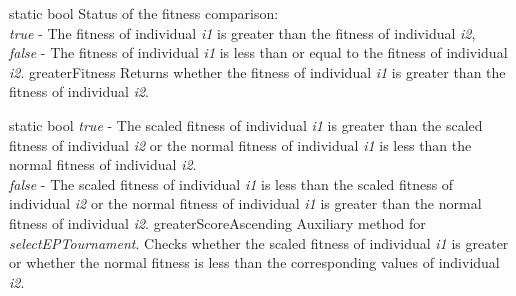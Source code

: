 \vspace*{4ex}

\setNormalInstance
\setCorrectWidthThree{8pt}
\printMethodWithParamsSaved
{static bool}
{Status of the fitness comparison:\\
 {\em true} - The fitness of individual {\em i1} is greater than the fitness
 of individual {\em i2},\\
 {\em false} - The fitness of individual {\em i1} is less than or equal
 to the fitness of individual {\em i2}.}
{greaterFitness}
{Returns whether the fitness of individual {\em i1} is greater than the 
 fitness of individual {\em i2}.}
{}
\setCorrectWidthThree{4pt}

\clearpage

\setNormalInstance
\setCorrectWidthThree{8pt}
\printMethodWithParamsSaved
{static bool}
{
 {\em true} - The scaled fitness of individual {\em i1}
              is greater than the scaled fitness of individual {\em i2}
              or the normal fitness of individual {\em i1} is less than
              the normal fitness of individual {\em i2}.\\
 {\em false} - The scaled fitness of individual {\em i1} is less than
               the scaled fitness of individual {\em i2} or the
               normal fitness of individual {\em i1} is greater than
               the normal fitness of individual {\em i2}.}
{greaterScoreAscending}
{Auxiliary method for {\em selectEPTournament}.
 Checks whether the scaled fitness of individual {\em i1} 
 is greater or whether the normal fitness is less than the
 corresponding values of individual {\em i2}.}
{}
\setCorrectWidthThree{4pt}

\vspace*{4ex}

